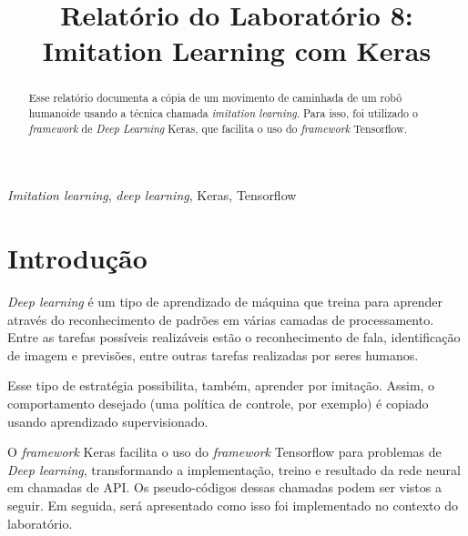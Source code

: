 \documentclass[conference]{IEEEtran}
\begin{document}
\title{Relatório do Laboratório 8: \\ Imitation Learning com Keras\\
}

\author{
}

\maketitle

\begin{abstract}
Esse relatório documenta a cópia de um movimento de caminhada de um robô humanoide usando a técnica chamada \textit{imitation learning}. Para isso, foi utilizado o \textit{framework} de \textit{Deep Learning} Keras, que facilita o uso do \textit{framework} Tensorflow.
\end{abstract}

\begin{IEEEkeywords}
\textit{Imitation learning}, \textit{deep learning}, Keras, Tensorflow
\end{IEEEkeywords}

\section{Introdução}
\textit{Deep learning} é um tipo de aprendizado de máquina que treina para aprender através do reconhecimento de padrões em várias camadas de processamento. Entre as tarefas possíveis realizáveis estão o reconhecimento de fala, identificação de imagem e previsões, entre outras tarefas realizadas por seres humanos. 

Esse tipo de estratégia possibilita, também, aprender por imitação. Assim, o comportamento desejado (uma política de controle, por exemplo) é copiado usando aprendizado supervisionado.

O \textit{framework} Keras facilita o uso do \textit{framework} Tensorflow para problemas de \textit{Deep learning}, transformando a implementação, treino e resultado da rede neural em chamadas de API. Os pseudo-códigos dessas chamadas podem ser vistos a seguir. Em seguida, será apresentado como isso foi implementado no contexto do laboratório.
\end{document}
